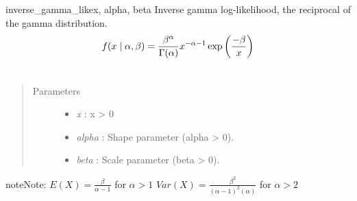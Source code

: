 \hypertarget{pymc.distributions.inverse_gamma_like}{}\begin{funcdesc}{inverse\_gamma\_like}{x, alpha, beta}
Inverse gamma log-likelihood, the reciprocal of the gamma distribution.
\begin{gather}
\begin{split}f(x \mid \alpha, \beta) = \frac{\beta^{\alpha}}{\Gamma(\alpha)} x^{-\alpha - 1} \exp\left(\frac{-\beta}{x}\right)\end{split}\notag\\\begin{split}\end{split}\notag
\end{gather}\begin{quote}\begin{description}
\item[Parameters] \leavevmode\begin{itemize}
\item {} 
\emph{x} : x \textgreater{} 0

\item {} 
\emph{alpha} : Shape parameter (alpha \textgreater{} 0).

\item {} 
\emph{beta} : Scale parameter (beta \textgreater{} 0).

\end{itemize}

\end{description}\end{quote}

\begin{notice}{note}{Note:}
$E(X)=\frac{\beta}{\alpha-1}$  for $\alpha > 1$
$Var(X)=\frac{\beta^2}{(\alpha-1)^2(\alpha)}$  for $\alpha > 2$
\end{notice}
\end{funcdesc}

